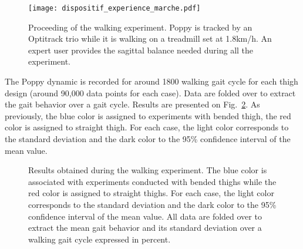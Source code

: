 \begin{figure}[!h]
    \centering
    \texttt{[image: dispositif\_experience\_marche.pdf]}
    \caption{Proceeding of the walking experiment.
    Poppy is tracked by an Optitrack trio while it is walking on a treadmill set at 1.8km/h.
    An expert user provides the sagittal balance needed during all the experiment.}
    \label{fig:walking_experiment}
\end{figure}

The Poppy dynamic is recorded for around 1800 walking gait cycle for each thigh design (around 90,000 data points for each case). Data are folded over to extract the gait behavior over a gait cycle. Results are presented on Fig.~\ref{fig:walk_result}. As previously, the blue color is assigned to experiments with bended thigh, the red color is assigned to straight thigh. For each case, the light color corresponds to the standard deviation and the dark color to the 95\% confidence interval of the mean value.

\begin{figure}[!h]
    \hfil
    \hfil
    \hfil
    \hfil
    \hfil
    \caption{Results obtained during the walking experiment.
    The blue color is associated with experiments conducted with bended thighs while the red color is assigned to straight thighs.
    For each case, the light color corresponds to the standard deviation and the dark color to the 95\% confidence interval of the mean value.
    All data are folded over to extract the mean gait behavior and its standard deviation over a walking gait cycle expressed in percent.}
    \label{fig:walk_result}
\end{figure}

